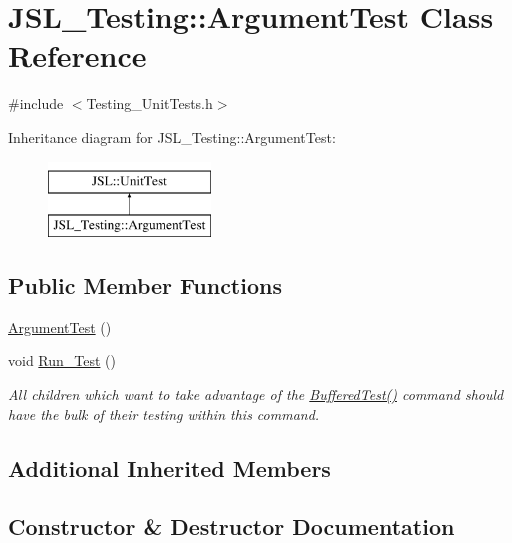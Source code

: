 \hypertarget{classJSL__Testing_1_1ArgumentTest}{}\section{J\+S\+L\+\_\+\+Testing\+:\+:Argument\+Test Class Reference}
\label{classJSL__Testing_1_1ArgumentTest}


{\ttfamily \#include $<$Testing\+\_\+\+Unit\+Tests.\+h$>$}

Inheritance diagram for J\+S\+L\+\_\+\+Testing\+:\+:Argument\+Test\+:\begin{figure}[H]
\begin{center}
\leavevmode
\includegraphics[height=2.000000cm]{classJSL__Testing_1_1ArgumentTest}
\end{center}
\end{figure}
\subsection*{Public Member Functions}
\begin{DoxyCompactItemize}
\item 
\hyperlink{classJSL__Testing_1_1ArgumentTest_a3d83658826bd70b33349e53a7326ae5a}{Argument\+Test} ()
\item 
void \hyperlink{classJSL__Testing_1_1ArgumentTest_a1c4c626d57e448da86866ef414308e97}{Run\+\_\+\+Test} ()
\begin{DoxyCompactList}\small\item\em All children which want to take advantage of the \hyperlink{classJSL_1_1UnitTest_aabec19b081be8a428f12e4b5e3dc2a9c}{Buffered\+Test()} command should have the bulk of their testing within this command. \end{DoxyCompactList}\end{DoxyCompactItemize}
\subsection*{Additional Inherited Members}


\subsection{Constructor \& Destructor Documentation}
\mbox{\label{classJSL__Testing_1_1ArgumentTest_a3d83658826bd70b33349e53a7326ae5a}} 
